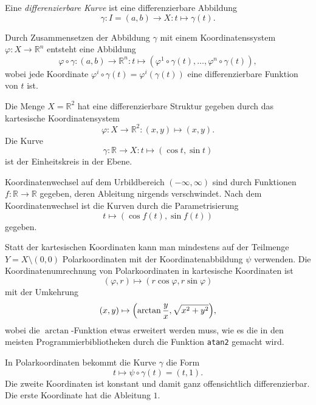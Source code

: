 \begin{definition}
Eine {\em differenzierbare Kurve}
%
%
ist eine differenzierbare Abbildung
\[
\gamma
\colon
I = (a,b) \to X
:
t \mapsto \gamma(t).
\]
\end{definition}

Durch Zusammensetzen der Abbildung $\gamma$ mit einem Koordinatenssystem
$\varphi\colon X\to \mathbb{R}^n$ entsteht eine Abbildung 
\[
\varphi\circ\gamma
\colon
(a,b) \to \mathbb{R}^n
:
t \mapsto (\varphi^1\circ \gamma(t),\dots,\varphi^n\circ\gamma(t)),
\]
wobei jede Koordinate $\varphi^i\circ\gamma(t) = \varphi^i(\gamma(t))$
eine differenzierbare Funktion von $t$ ist.



\begin{beispiel}
Die Menge $X=\mathbb{R}^2$ hat eine differenzierbare Struktur gegeben durch
das kartesische Koordinatensystem
\[
\varphi
\colon
X\to\mathbb{R}^2
:
(x,y)\mapsto (x,y).
\]
Die Kurve 
\[
\gamma
\colon
\mathbb{R}\to X
:
t\mapsto (\cos t, \sin t)
\]
ist der Einheitskreis in der Ebene.

Koordinatenwechsel auf dem Urbildbereich $(-\infty,\infty)$ sind durch
Funktionen $f\colon\mathbb{R}\to\mathbb{R}$ gegeben, deren Ableitung
nirgends verschwindet.
Nach dem Koordinatenwechsel ist die Kurven durch die Parametrisierung
\[
t \mapsto (\cos f(t),\sin f(t))
\]
gegeben.

Statt der kartesischen Koordinaten kann man mindestens auf der Teilmenge
$Y=X\setminus (0,0)$ Polarkoordinaten mit der Koordinatenabbildung $\psi$
verwenden.
Die Koordinatenumrechnung von Polarkoordinaten in kartesische Koordinaten
ist
\[
(\varphi, r) \mapsto (r\cos\varphi,r\sin\varphi)
\]
mit der Umkehrung
\[
(x,y) \mapsto \Bigl(\arctan\frac{y}{x},\sqrt{x^2+y^2}\Bigr),
\]
wobei die $\arctan$-Funktion etwas erweitert werden muss, wie es die
in den meisten Programmierbibliotheken durch die Funktion \texttt{atan2}
gemacht wird.

In Polarkoordinaten bekommt die Kurve $\gamma$ die Form
\[
t\mapsto \psi\circ\gamma(t)
=
(t, 1).
\]
Die zweite Koordinaten ist konstant und damit ganz offensichtlich 
differenzierbar.
Die erste Koordinate hat die Ableitung $1$.
\end{beispiel}

